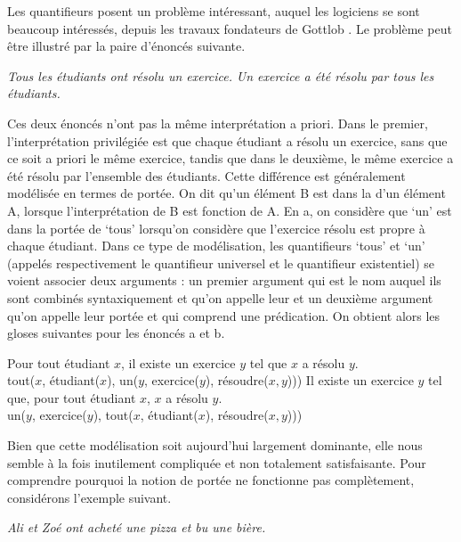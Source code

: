 {Les quantifieurs posent un problème intéressant, auquel les logiciens se sont beaucoup intéressés, depuis les travaux fondateurs de Gottlob \cite{frege1892uber}. Le problème peut être illustré par la paire d’énoncés suivante.

\ea\label{ex:13-portée}
\ea \textit{Tous les étudiants ont résolu un exercice.}
\ex \textit{Un exercice a été résolu par tous les étudiants.}\z\z

Ces deux énoncés n’ont pas la même interprétation a priori. Dans le premier, l’interprétation privilégiée est que chaque étudiant a résolu un exercice, sans que ce soit a priori le même exercice, tandis que dans le deuxième, le même exercice a été résolu par l’ensemble des étudiants. Cette différence est généralement modélisée en termes de portée. On dit qu’un élément B est dans la  d’un élément A, lorsque l’interprétation de B est fonction de A. En a, on considère que ‘un’ est dans la portée de ‘tous’ lorsqu’on considère que l’exercice résolu est propre à chaque étudiant. Dans ce type de modélisation, les quantifieurs ‘tous’ et ‘un’ (appelés respectivement le quantifieur universel et le quantifieur existentiel) se voient associer deux arguments : un premier argument qui est le nom auquel ils sont combinés syntaxiquement et qu’on appelle leur  et un deuxième argument qu’on appelle leur portée et qui comprend une prédication. On obtient alors les gloses suivantes pour les énoncés a et b.

\ea
\ea Pour tout étudiant $x$, il existe un exercice $y$ tel que $x$ a résolu $y$.\\
tout($x$, étudiant($x$), un($y$, exercice($y$), résoudre($x,y$)))
\ex Il existe un exercice $y$ tel que, pour tout étudiant $x$, $x$ a résolu $y$.\\
un($y$, exercice($y$), tout($x$, étudiant($x$), résoudre($x,y$)))\z\z

Bien que cette modélisation soit aujourd’hui largement dominante, elle nous semble à la fois inutilement compliquée et non totalement satisfaisante. Pour comprendre pourquoi la notion de portée ne fonctionne pas complètement, considérons l’exemple suivant.

\ea\label{ex:13-pizza} \textit{Ali et Zoé ont acheté une pizza et bu une bière.}\z

}
